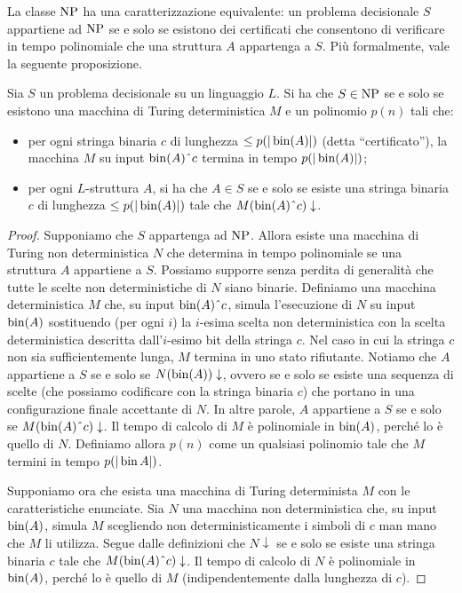 La classe $\operatorname{NP}$ ha una caratterizzazione equivalente: un problema decisionale $S$ appartiene ad $\operatorname{NP}$ se e solo se esistono dei certificati che consentono di verificare in tempo polinomiale che una struttura $A$ appartenga a $S$.
Più formalmente, vale la seguente proposizione.

\begin{proposizione}
  \label{prop:caratterizzazione-np}
  Sia $S$ un problema decisionale su un linguaggio $L$.
  Si ha che $S \in \operatorname{NP}$ se e solo se esistono una macchina di Turing deterministica $M$ e un polinomio $p(n)$ tali che:
  \begin{itemize}
    \item per ogni stringa binaria $c$ di lunghezza $\leq p(|\operatorname{bin}(A)|)$ (detta ``certificato''), la macchina $M$ su input $\bin(A)\string^ c$ termina in tempo $p(|\operatorname{bin}(A)|)$;
    \item per ogni $L$-struttura $A$, si ha che $A\in S$ se e solo se esiste una stringa binaria $c$ di lunghezza $\leq p(|\operatorname{bin}(A)|)$ tale che $M(\bin(A)\string^ c)\downarrow$.
  \end{itemize}
\end{proposizione}

\begin{proof}
  Supponiamo che $S$ appartenga ad $\operatorname{NP}$. Allora esiste una macchina di Turing non deterministica $N$ che determina in tempo polinomiale se una struttura $A$ appartiene a $S$.
  Possiamo supporre senza perdita di generalità che tutte le scelte non deterministiche di $N$ siano binarie.
  Definiamo una macchina deterministica $M$ che, su input $\bin(A)\string^ c$, simula l'esecuzione di $N$ su input $\operatorname{bin}(A)$ sostituendo (per ogni $i$) la $i$-esima scelta non deterministica con la scelta deterministica descritta dall'$i$-esimo bit della stringa $c$. Nel caso in cui la stringa $c$ non sia sufficientemente lunga, $M$ termina in uno stato rifiutante.
  Notiamo che $A$ appartiene a $S$ se e solo se $N(\operatorname{bin}(A))\downarrow$, ovvero se e solo se esiste una sequenza di scelte (che possiamo codificare con la stringa binaria $c$) che portano in una configurazione finale accettante di $N$. In altre parole, $A$ appartiene a $S$ se e solo se $M(\bin(A)\string^c)\downarrow$.
  Il tempo di calcolo di $M$ è polinomiale in $\operatorname{bin}(A)$, perché lo è quello di $N$.
  Definiamo allora $p(n)$ come un qualsiasi polinomio tale che $M$ termini in tempo $p(|\operatorname{bin} A|)$.
  
  Supponiamo ora che esista una macchina di Turing determinista $M$ con le caratteristiche enunciate.
  Sia $N$ una macchina non deterministica che, su input $\operatorname{bin}(A)$, simula $M$ scegliendo non deterministicamente i simboli di $c$ man mano che $M$ li utilizza.
  Segue dalle definizioni che $N\downarrow$ se e solo se esiste una stringa binaria $c$ tale che $M(\bin(A)\string^c)\downarrow$.
  Il tempo di calcolo di $N$ è polinomiale in $\operatorname{bin}(A)$, perché lo è quello di $M$ (indipendentemente dalla lunghezza di $c$).
\end{proof}


